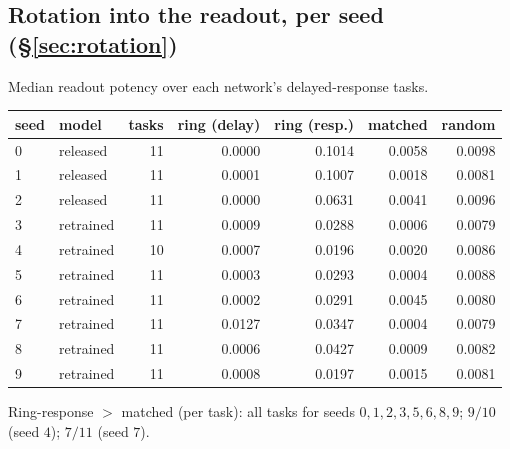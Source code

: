 \documentclass[11pt]{article}
\begin{document}
\subsection{Rotation into the readout, per seed (\S\ref{sec:rotation})}
Median readout potency over each network's delayed-response tasks.
\begin{center}\small
\begin{tabular}{llrrrrr}
\toprule
seed & model & tasks & ring (delay) & ring (resp.) & matched & random \\
\midrule
0 & released & 11 & 0.0000 & 0.1014 & 0.0058 & 0.0098 \\
1 & released & 11 & 0.0001 & 0.1007 & 0.0018 & 0.0081 \\
2 & released & 11 & 0.0000 & 0.0631 & 0.0041 & 0.0096 \\
3 & retrained & 11 & 0.0009 & 0.0288 & 0.0006 & 0.0079 \\
4 & retrained & 10 & 0.0007 & 0.0196 & 0.0020 & 0.0086 \\
5 & retrained & 11 & 0.0003 & 0.0293 & 0.0004 & 0.0088 \\
6 & retrained & 11 & 0.0002 & 0.0291 & 0.0045 & 0.0080 \\
7 & retrained & 11 & 0.0127 & 0.0347 & 0.0004 & 0.0079 \\
8 & retrained & 11 & 0.0006 & 0.0427 & 0.0009 & 0.0082 \\
9 & retrained & 11 & 0.0008 & 0.0197 & 0.0015 & 0.0081 \\
\bottomrule
\end{tabular}
\end{center}
Ring-response $>$ matched (per task): all tasks for seeds $0,1,2,3,5,6,8,9$; $9/10$ (seed $4$);
$7/11$ (seed $7$).
\end{document}
